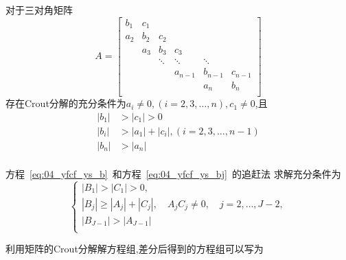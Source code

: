 \begin{Theorem}[Crout分解的充分条件]
对于三对角矩阵
\begin{equation*}
A=\begin{bmatrix}
   b_1 & c_1 \\
   a_2 & b_2 & c_2 \\
       & a_3 & b_3    & c_3 \\
       &     & \ddots & \ddots  & \ddots            \\
       &     &        & a_{n-1} & b_{n-1} & c_{n-1} \\
       &     &        &         &   a_n   & b_n     \\
  \end{bmatrix}
\end{equation*}
存在Crout分解的充分条件为$a_i\not=0,(i=2,3,\ldots,n),c_1\not=0$,且
\begin{equation*}
\begin{split}
|b_1|&>|c_1|>0 \\
|b_i|&>|a_1|+|c_i|,(i=2,3,\ldots,n-1) \\
|b_n|&>|a_n|   \\
\end{split}
\end{equation*}
\end{Theorem}\par
方程~\eqref{eq:04_yfcf_ys_b}~和方程~\eqref{eq:04_yfcf_ys_bj}~的追赶法
求解充分条件为
\begin{equation}
\begin{cases}
|B_1|>|C_1|>0,\\
|B_j|\geq |A_j|+|C_j|,\quad A_j C_j\not=0,\quad j=2,\ldots,J-2,\\
|B_{J-1}|>|A_{J-1}| \\
\end{cases}
\end{equation}\par
利用矩阵的Crout分解解方程组,差分后得到的方程组可以写为
